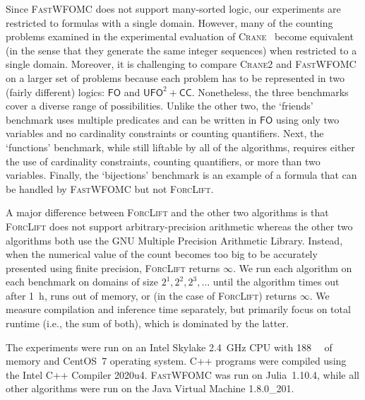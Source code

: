 \documentclass[letterpaper]{article} %
\theoremstyle{remark}
\theoremstyle{definition}
\newcommand{\FO}{$\mathsf{FO}$}
\newcommand{\UFO}{$\mathsf{UFO}^{2} + \mathsf{CC}$}
\newcommand{\Cranetwo}{\textsc{Crane2}}
\begin{document}
Since \textsc{FastWFOMC} does not support many-sorted logic, our experiments are
restricted to formulas with a single domain. However, many of the counting
problems examined in the experimental evaluation of
\textsc{Crane}~\cite{DBLP:conf/kr/DilkasB23} become equivalent (in the sense
that they generate the same integer sequences) when restricted to a single
domain. Moreover, it is challenging to compare \Cranetwo{} and
\textsc{FastWFOMC} on a larger set of problems because each problem has to be
represented in two (fairly different) logics: \FO{} and \UFO{}. Nonetheless, the
three benchmarks cover a diverse range of possibilities. Unlike the other two,
the `friends' benchmark uses multiple predicates and can be written in \FO{}
using only two variables and no cardinality constraints or counting quantifiers.
Next, the `functions' benchmark, while still liftable by all of the algorithms,
requires either the use of cardinality constraints, counting quantifiers, or
more than two variables. Finally, the `bijections' benchmark is an example of a
formula that can be handled by \textsc{FastWFOMC} but not \textsc{ForcLift}.


A major difference between \textsc{ForcLift} and the other two algorithms is
that \textsc{ForcLift} does not support arbitrary-precision arithmetic whereas
the other two algorithms both use the GNU Multiple Precision Arithmetic Library.
Instead, when the numerical value of the count becomes too big to be accurately
presented using finite precision, \textsc{ForcLift} returns $\infty$. We run
each algorithm on each benchmark on domains of size $2^{1}, 2^{2}, 2^{3},\dots$
until the algorithm times out after \SI{1}{\hour}, runs out of memory, or (in
the case of \textsc{ForcLift}) returns $\infty$. We measure compilation and
inference time separately, but primarily focus on total runtime (i.e., the sum
of both), which is dominated by the latter.


The experiments were run on an Intel Skylake \SI{2.4}{\giga\hertz} CPU with
\SI{188}{\gibi\byte} of memory and CentOS~7 operating system. C++ programs were
compiled using the Intel C++ Compiler 2020u4. \textsc{FastWFOMC} was run on
Julia~1.10.4, while all other algorithms were run on the Java Virtual Machine
1.8.0\_201.
\end{document}
